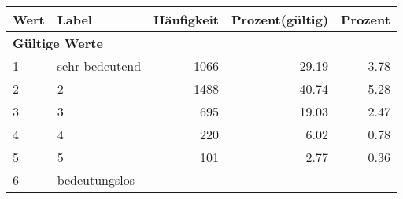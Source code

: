      \begin{longtable}{lXrrr}
     \toprule
     \textbf{Wert} & \textbf{Label} & \textbf{Häufigkeit} & \textbf{Prozent(gültig)} & \textbf{Prozent} \\
     \endhead
     \midrule
     \multicolumn{5}{l}{\textbf{Gültige Werte}}\\

     1 &
     \multicolumn{1}{X}{ sehr bedeutend   } &


       \num{1066} &
       \num[round-mode=places,round-precision=2]{29.19} &
         \num[round-mode=places,round-precision=2]{3.78} \\

     2 &
     \multicolumn{1}{X}{ 2   } &


       \num{1488} &
       \num[round-mode=places,round-precision=2]{40.74} &
         \num[round-mode=places,round-precision=2]{5.28} \\

     3 &
     \multicolumn{1}{X}{ 3   } &


       \num{695} &
       \num[round-mode=places,round-precision=2]{19.03} &
         \num[round-mode=places,round-precision=2]{2.47} \\

     4 &
     \multicolumn{1}{X}{ 4   } &


       \num{220} &
       \num[round-mode=places,round-precision=2]{6.02} &
         \num[round-mode=places,round-precision=2]{0.78} \\

     5 &
     \multicolumn{1}{X}{ 5   } &


       \num{101} &
       \num[round-mode=places,round-precision=2]{2.77} &
         \num[round-mode=places,round-precision=2]{0.36} \\

     6 &
     \multicolumn{1}{X}{ bedeutungslos   } &



\end{longtable}
